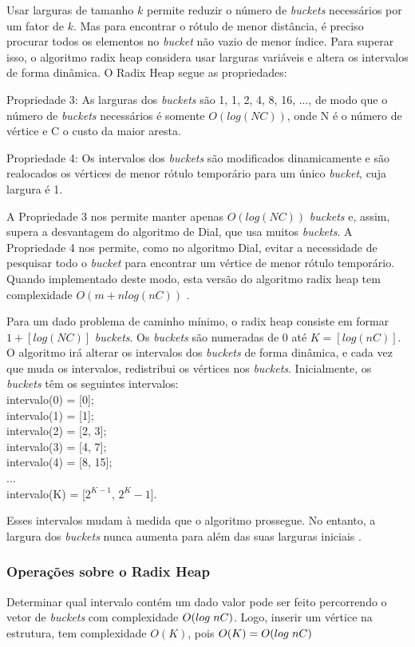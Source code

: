 Usar larguras de tamanho $k$ permite reduzir o número de \textit{buckets} necessários por um fator de $k$.
Mas para encontrar o rótulo de menor distância, é preciso procurar todos os elementos no \textit{bucket} não vazio de menor índice.
Para superar isso, o algoritmo radix heap considera usar larguras variáveis e altera os intervalos de forma dinâmica. 
O Radix Heap segue as pro\-prie\-dades:

Propriedade 3: As larguras dos \textit{buckets} são 1, 1, 2, 4, 8, 16, ..., de modo que o número de \textit{buckets} necessários é somente $O(log(NC))$,
onde N é o número de vértice e C o custo da maior aresta.

Propriedade 4: Os intervalos dos \textit{buckets} são modificados dinamicamente e são realocados os vértices de menor rótulo temporário
para um único \textit{bucket}, cuja largura é 1.

A Propriedade 3 nos permite manter apenas $O(log(NC))$ \textit{buckets} e, assim, supera a desvantagem do algoritmo
de Dial, que usa muitos \textit{buckets}.
A Propriedade 4 nos permite, como no algoritmo Dial, evitar a necessidade de 
pesquisar todo o \textit{bucket} para encontrar um vértice de menor rótulo temporário. Quando implementado deste modo, esta 
versão do algoritmo radix heap tem complexidade $O(m + nlog(nC))$ \cite{bookahuja}.

Para um dado problema de caminho mínimo, o radix heap consiste em formar $1 + [log(NC)]$ \textit{buckets}.
Os \textit{buckets} são numeradas de $0$ até $K = [log(nC)]$.
O algoritmo irá alterar os intervalos dos \textit{buckets} de forma dinâmica, e cada vez que muda os intervalos,
redistribui os vértices nos \textit{buckets}. Inicialmente, os \textit{buckets} têm os seguintes intervalos:\\
intervalo(0) = [0];\\
intervalo(1) = [1];\\
intervalo(2) = [2, 3];\\
intervalo(3) = [4, 7];\\
intervalo(4) = [8, 15];\\
...\\
intervalo(K) = [$2^{K - 1}$, $2^K - 1$].

Esses intervalos mudam à medida que o algoritmo prossegue. No entanto, a largura dos \textit{buckets} nunca aumenta
para além das suas larguras iniciais \cite{bookahuja}.

\subsubsection{Operações sobre o Radix Heap}
Determinar qual intervalo contém um dado valor pode ser feito percorrendo o vetor de \textit{buckets} com complexidade $O(log \hspace*{1mm} nC)$.
Logo, inserir um vértice na estrutura, tem complexidade $O(K)$, pois $O(K) = O(log \hspace*{1mm} nC)$

